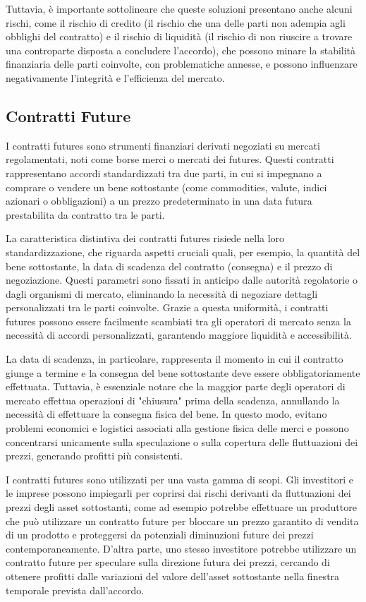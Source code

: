 \documentclass[12pt,a4paper]{report}
\begin{document}
Tuttavia, è importante sottolineare che queste soluzioni presentano anche alcuni rischi, come il rischio di credito (il rischio che una delle parti non adempia agli obblighi del contratto) e il rischio di liquidità (il rischio di non riuscire a trovare una controparte disposta a concludere l'accordo), che possono minare la stabilità finanziaria delle parti coinvolte, con problematiche annesse, e possono influenzare negativamente l'integrità e l'efficienza del mercato.

\subsection{Contratti Future}

I contratti futures sono strumenti finanziari derivati negoziati su mercati regolamentati, noti come borse merci o mercati dei futures. Questi contratti rappresentano accordi standardizzati tra due parti, in cui si impegnano a comprare o vendere un bene sottostante (come commodities, valute, indici azionari o obbligazioni) a un prezzo predeterminato in una data futura prestabilita da contratto tra le parti.

La caratteristica distintiva dei contratti futures risiede nella loro standardizzazione, che riguarda aspetti cruciali quali, per esempio, la quantità del bene sottostante, la data di scadenza del contratto (consegna) e il prezzo di negoziazione. Questi parametri sono fissati in anticipo dalle autorità regolatorie o dagli organismi di mercato, eliminando la necessità di negoziare dettagli personalizzati tra le parti coinvolte. Grazie a questa uniformità, i contratti futures possono essere facilmente scambiati tra gli operatori di mercato senza la necessità di accordi personalizzati, garantendo maggiore liquidità e accessibilità.

La data di scadenza, in particolare, rappresenta il momento in cui il contratto giunge a termine e la consegna del bene sottostante deve essere obbligatoriamente effettuata. Tuttavia, è essenziale notare che la maggior parte degli operatori di mercato effettua operazioni di "chiusura" prima della scadenza, annullando la necessità di effettuare la consegna fisica del bene. In questo modo, evitano problemi economici e logistici associati alla gestione fisica delle merci e possono concentrarsi unicamente sulla speculazione o sulla copertura delle fluttuazioni dei prezzi, generando profitti più consistenti.

I contratti futures sono utilizzati per una vasta gamma di scopi. Gli investitori e le imprese possono impiegarli per coprirsi dai rischi derivanti da fluttuazioni dei prezzi degli asset sottostanti, come ad esempio potrebbe effettuare un produttore che può utilizzare un contratto future per bloccare un prezzo garantito di vendita di un prodotto e proteggersi da potenziali diminuzioni future dei prezzi contemporaneamente. D'altra parte, uno stesso investitore potrebbe utilizzare un contratto future per speculare sulla direzione futura dei prezzi, cercando di ottenere profitti dalle variazioni del valore dell'asset sottostante nella finestra temporale prevista dall'accordo.
\end{document}
